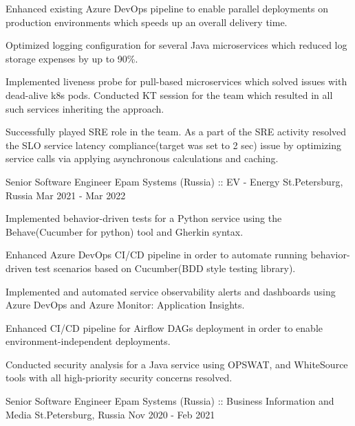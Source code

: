 \begin{cventries}
{\begin{cvitems}
        \item {Enhanced existing Azure DevOps pipeline to enable parallel deployments on production environments which speeds up an overall delivery time.}
        \item {Optimized logging configuration for several Java microservices which reduced log storage expenses by up to 90\%.}
        \item {Implemented liveness probe for pull-based microservices which solved issues with dead-alive k8s pods. 
        Conducted KT session for the team which resulted in all such services inheriting the approach.}
        \item {Successfully played SRE role in the team. As a part of the SRE activity resolved the SLO service latency compliance(target was set to 2 sec) 
        issue by optimizing service calls via applying asynchronous calculations and caching.}
      \end{cvitems}
    }
\cventry
{Senior Software Engineer} %
{Epam Systems (Russia) ::  EV - Energy} %
{St.Petersburg, Russia} %
{Mar 2021 - Mar 2022} %
{
  \begin{cvitems} %
    \item {Implemented behavior-driven tests for a Python service using the Behave(Cucumber for python) tool and Gherkin syntax.}
    \item {Enhanced Azure DevOps CI/CD pipeline in order to automate running behavior-driven test scenarios based on Cucumber(BDD style testing library).}
    \item {Implemented and automated service observability alerts and dashboards using Azure DevOps and Azure Monitor: Application Insights.}
    \item {Enhanced CI/CD pipeline for Airflow DAGs deployment in order to enable environment-independent deployments.}
    \item {Conducted security analysis for a Java service using OPSWAT, and WhiteSource tools with all high-priority security concerns resolved.}
  \end{cvitems}
}
\cventry
{Senior Software Engineer} %
{Epam Systems (Russia) ::  Business Information and Media} %
{St.Petersburg, Russia} %
{Nov 2020 - Feb 2021} %
{
  \begin{cvitems} %

\end{cvitems}}
\end{cventries}
